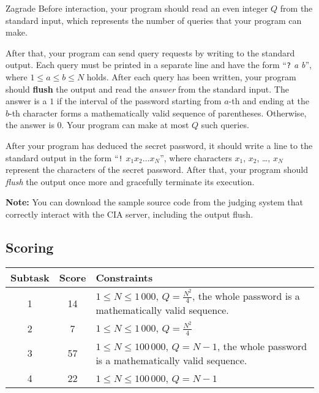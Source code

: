 \begin{statement}[
  problempoints=100,
  timelimit=3 seconds,
  memorylimit=512 MiB,
]{Zagrade}
Before interaction, your program should read an even integer $Q$ from the
standard input, which represents the number of queries that your program can
make.

After that, your program can send query requests by writing to the standard
output. Each query must be printed in a separate line and have the
form ``\texttt{?} \textit{a b}'', where $1 \le a \le b \le N$ holds. After
each query has been written, your program should \textbf{flush} the output
and read the \textit{answer} from the standard input. The answer is a $1$ if
the interval of the password starting from $a$-th and ending at the $b$-th
character forms a mathematically valid sequence of parentheses. Otherwise,
the answer is $0$. Your program can make at most $Q$ such queries.

After your program has deduced the secret password, it should write a line to
the standard output in the form ``\texttt{!} \textit{$x_1x_2\dots x_N$}'', where
characters $x_1$, $x_2$, \dots, $x_N$ represent the characters of the secret
password. After that, your program should \textit{flush} the output once more
and gracefully terminate its execution.

\textbf{Note:} You can download the sample source code from the judging system
that correctly interact with the CIA server, including the output flush.

\subsection*{Scoring}
{\renewcommand{\arraystretch}{1.4}
  \setlength{\tabcolsep}{6pt}
  \begin{tabular}{ccl}
    Subtask & Score & Constraints \\ \midrule
    1 & 14 & $1 \le N \le 1\,000$, $Q = \frac{N^2}{4}$, the whole password is a
            mathematically valid sequence. \\
    2 & 7 & $1 \le N \le 1\,000$, $Q = \frac{N^2}{4}$ \\
    3 & 57 & $1 \le N \le 100\,000 $, $Q = N - 1$,
             the whole password is a mathematically valid sequence. \\
    4 & 22 & $1 \le N \le 100\,000 $, $Q = N - 1$ \\
\end{tabular}}


\end{statement}

